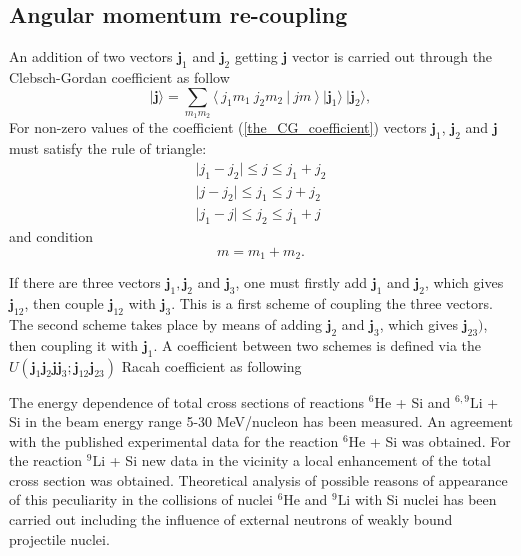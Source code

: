 \documentclass[12pt,a4paper,twoside]{article}
\begin{document}
\subsection*{Angular momentum re-coupling}
An addition of two vectors $\mathbf{j}_1$ and $\mathbf{j}_2$ getting $\mathbf{j}$ vector is carried out through the Clebsch-Gordan coefficient as follow
\begin{equation}
\label{the_CG_coefficient}
\vert \mathbf{j} \rangle =\sum_{m_1 m_2} \langle ~ j_1 m_1~j_2 m_2~ \vert ~j m~  \rangle ~ \vert \mathbf{j}_1 \rangle~ \vert \mathbf{j}_2 \rangle,
\end{equation}
For non-zero values of the coefficient (\ref{the_CG_coefficient}) vectors $\mathbf{j}_1$, $\mathbf{j}_2$ and $\mathbf{j}$ must satisfy the rule of triangle:
\begin{eqnarray}
\vert j_1 - j_2 \vert \leq j \leq j_1 + j_2 \\
\vert j - j_2 \vert \leq j_1 \leq j + j_2 \\ 
\vert j_1 - j \vert \leq j_2 \leq j_1 + j 
\end{eqnarray}
and condition
\begin{equation}
m=m_1+m_2.
\end{equation}


If there are three vectors $\mathbf{j}_1, \mathbf{j}_2$ and $\mathbf{j}_3$, one must firstly add $\mathbf{j}_1$ and $\mathbf{j}_2$, which gives $\mathbf{j}_{12}$, then couple $\mathbf{j}_{12}$ with $\mathbf{j}_3$. This is a first scheme of coupling the three vectors. The second scheme takes place by means of adding $\mathbf{j}_2$ and $\mathbf{j}_3$, which gives $\mathbf{j}_{23})$, then coupling  it with  $\mathbf{j}_1$. A coefficient between two schemes is defined  via the $U(\mathbf{j}_1 \mathbf{j}_2 \mathbf{j} \mathbf{j}_3; \mathbf{j}_{12} \mathbf{j}_{23})$ Racah coefficient as following  





The energy dependence of total cross sections of reactions $^6\text{He}$ + Si and $^{6,9}\text{Li}$ + Si in the beam energy range 5-30 MeV/nucleon has been measured. An agreement with the published experimental data for the reaction $^6$He + Si was obtained. For the reaction $^9\text{Li}$ + Si new data in the vicinity a local enhancement of the total cross section was obtained. Theoretical analysis of possible reasons of appearance of this peculiarity in the collisions of nuclei $^6\text{He}$ and $^9\text{Li}$ with Si nuclei has been carried out including the influence of external neutrons of weakly bound projectile nuclei.
\\[0.3cm]
\end{document}
